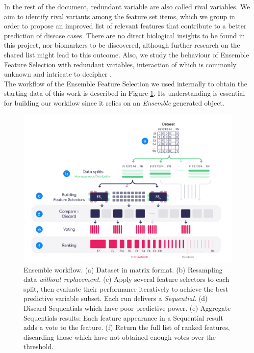 In the rest of the document, redundant variable are also called rival variables. We aim to identify rival variants among the feature set items, which we group in order to propose an improved list of relevant features that contribute to a better prediction of disease cases. There are no direct biological insights to be found in this project, nor biomarkers to be discovered, although further research on the shared list might lead to this outcome. Also, we study the behaviour of Ensemble Feature Selection with redundant variables, interaction of which is commonly unknown and intricate to decipher \cite{Saeys2007ABioinformatics}.
\\

The workflow of the Ensemble Feature Selection we used internally to obtain the starting data of this work is described in Figure \ref{fig:Ensemble-diagram}. Its understanding is essential for building our workflow since it relies on an \emph{Ensemble} generated object.
\\

\begin{figure}[!htpb]
    \centering
    \includegraphics[width=\linewidth]{Minor Thesis/figures/diagrams/Ensemble.png}
    \caption{Ensemble workflow. (a) Dataset in matrix format. (b) Resampling data \emph{without replacement}. (c) Apply several feature selectors to each split, then evaluate their performance iteratively to achieve the best predictive variable subset. Each run delivers a \emph{Sequential}. (d) Discard Sequentials which have poor predictive power. (e) Aggregate Sequentials results: Each feature appearance in a Sequential result adds a vote to the feature. (f) Return the full list of ranked features, discarding those which have not obtained enough votes over the threshold.}
    \label{fig:Ensemble-diagram}
\end{figure}

